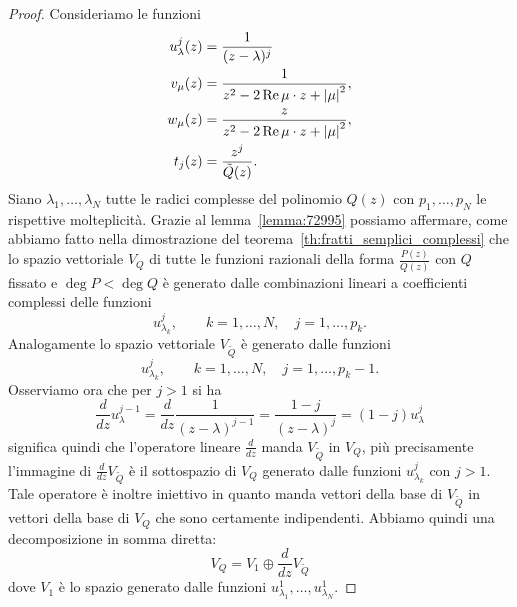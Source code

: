 \begin{proof}
Consideriamo le funzioni
\begin{align*}
   u_\lambda^j(z) &= \frac{1}{(z-\lambda)^j}\\
   v_\mu(z) &= \frac{1}{z^2-2 \operatorname{Re} \mu\cdot z + {\left|\mu\right|}^2},\\
   w_\mu(z) &= \frac{z}{z^2-2 \operatorname{Re} \mu\cdot z + {\left|\mu\right|}^2},\\
   t_j(z) &= \frac{z^j}{\tilde Q(z)}.
\end{align*}
Siano $\lambda_1, \dots, \lambda_N$ tutte le radici
complesse del polinomio $Q(z)$ con $p_1, \dots, p_N$
le rispettive molteplicità.
Grazie al lemma~\ref{lemma:72995} possiamo affermare,
come abbiamo fatto nella dimostrazione del
teorema~\ref{th:fratti_semplici_complessi} che lo
spazio vettoriale $V_Q$ di tutte le funzioni
razionali della forma $\frac{P(z)}{Q(z)}$
con $Q$ fissato e $\deg P<\deg Q$
è generato dalle combinazioni lineari
a coefficienti complessi delle funzioni
\[
  u_{\lambda_k}^j, \qquad k=1, \dots, N, \quad j=1, \dots, p_k.
\]
Analogamente lo spazio vettoriale $V_{\tilde Q}$
è generato dalle funzioni
\[
  u_{\lambda_k}^j, \qquad k=1, \dots, N, \quad j=1, \dots, p_k-1.
\]
Osserviamo ora che per $j>1$ si ha
\[
 \frac {d}{dz} u_\lambda^{j-1} =
 \frac {d}{dz} \frac{1}{(z-\lambda)^{j-1}}
 = \frac{1-j}{(z-\lambda)^j} = (1-j) u_\lambda^j
\]
significa quindi che l'operatore lineare $\frac d {dz}$
manda $V_{\tilde Q}$ in $V_Q$, più precisamente
l'immagine di $\frac{d}{dz} V_{\tilde Q}$ è il sottospazio
di $V_Q$ generato dalle funzioni $u_{\lambda_k}^j$
con $j>1$. Tale operatore
è inoltre iniettivo in quanto manda vettori della
base di $V_{\tilde Q}$ in vettori della base di $V_Q$
che sono certamente indipendenti.
Abbiamo quindi una decomposizione in somma diretta:
\[
  V_Q = V_1 \oplus \frac{d}{dz} V_{\tilde Q}
\]
dove $V_1$ è lo spazio generato
dalle funzioni $u_{\lambda_1}^1, \dots, u_{\lambda_N}^1$.


\end{proof}

